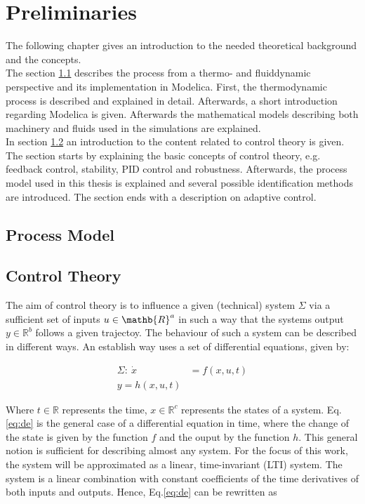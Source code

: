 \chapter{Preliminaries}
\label{chap:prelim}

The following chapter gives an introduction to the needed theoretical background and the concepts.\\

The section \ref{sec:model} describes the process from a thermo- and fluiddynamic perspective and its implementation in Modelica. First, the thermodynamic process is described and explained in detail. Afterwards, a short introduction regarding Modelica is given. Afterwards the mathematical models describing both machinery and fluids used in the simulations are explained. \\

In section \ref{sec:control} an introduction to the content related to control theory is given. The section starts by explaining the basic concepts of control theory, e.g. feedback control, stability, PID control and robustness. Afterwards, the process model used in this thesis is explained and several possible identification methods are introduced. The section ends with a description on adaptive control.


\section{Process Model}
\label{sec:model}

\section{Control Theory}
\label{sec:control}

The aim of control theory is to influence a given (technical) system $\Sigma$ via a sufficient set of inputs $u \in \mathb{R}^{a}$ in such a way that the systems output $y \in \mathbb{R}^b$ follows a given trajectoy. The behaviour of such a system can be described in different ways. An establish way uses a set of differential equations, given by:

\begin{align}
\label{eq:de}
\Sigma: ~\dot{x} &= f \left(x,u,t\right) \\
y = h\left(x,u,t\right)
\end{align}

Where $t \in \mathbb{R}$ represents the time, $x \in \mathbb{R}^c $ represents the states of a system. Eq.\ref{eq:de} is the general case of a differential equation in time, where the change of the state is given by the function $ f $ and the ouput by the function $h$. This general notion is sufficient for describing almost any system. For the focus of this work, the system will be approximated as a linear, time-invariant (LTI) system. The system is a linear combination with constant coefficients of the time derivatives of both inputs and outputs. Hence, Eq.\ref{eq:de} can be rewritten as

